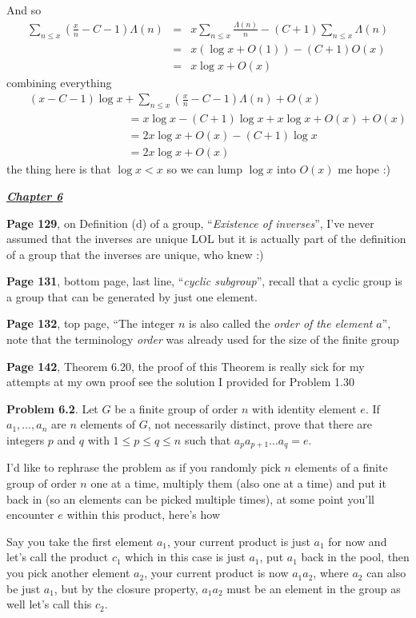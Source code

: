 \documentclass[aps,preprint,preprintnumbers,nofootinbib,showpacs,prd]{revtex4-1}
\newcommand{\nbea}{\begin{eqnarray*}}
\newcommand{\neea}{\end{eqnarray*}}
\begin{document}
And so
%
\nbea
\sum_{n\le x}\left(\frac{x}{n}-C-1\right)\Lambda(n) & = & x\sum_{n\le x}\frac{\Lambda(n)}{n} - (C+1)\sum_{n\le x}\Lambda(n) \\
& = & x(\log x + O(1)) - (C+1)O(x) \\
& = & x\log x + O(x)
\neea
%
combining everything
%
\nbea
&& (x-C-1)\log x+\sum_{n\le x}\left(\frac{x}{n}-C-1\right)\Lambda(n) + O(x) \\
&& ~~~~~~~~~~~~~~~~~~~~~~~~~~~~~~~~~~~~~~~~ = x\log x - (C+1)\log x + x\log x + O(x) + O(x) \\
&& ~~~~~~~~~~~~~~~~~~~~~~~~~~~~~~~~~~~~~~~~ = 2x\log x+O(x) - (C+1) \log x \\
&& ~~~~~~~~~~~~~~~~~~~~~~~~~~~~~~~~~~~~~~~~ = 2x\log x+O(x)
\neea
%
the thing here is that $\log x < x$ so we can lump $\log x$ into $O(x)$ me hope :)

\bigskip
\underline{\textbf{\textit{Chapter 6}}}
\bigskip

{\bf Page 129}, on Definition (d) of a group, ``{\it Existence of inverses}'', I've never assumed that the inverses are unique LOL but it is actually part of the definition of a group that the inverses are unique, who knew :)

{\bf Page 131}, bottom page, last line, ``{\it cyclic subgroup}'', recall that a cyclic group is a group that can be generated by just one element.

{\bf Page 132}, top page, ``The integer $n$ is also called the {\it order of the element} $a$'', note that the terminology {\it order} was already used for the size of the finite group

{\bf Page 142}, Theorem 6.20, the proof of this Theorem is really sick for my attempts at my own proof see the solution I provided for Problem 1.30

{\bf Problem 6.2}. Let $G$ be a finite group of order $n$ with identity element $e$. If $a_1,\ldots,a_n$ are $n$ elements of $G$, not necessarily distinct, prove that there are integers $p$ and $q$ with $1\le p \le q \le n$ such that $a_p a_{p+1} \ldots a_q = e$.

I'd like to rephrase the problem as if you randomly pick $n$ elements of a finite group of order $n$ one at a time, multiply them (also one at a time) and put it back in (so an elements can be picked multiple times), at some point you'll encounter $e$ within this product, here's how

Say you take the first element $a_1$, your current product is just $a_1$ for now and let's call the product $c_1$ which in this case is just $a_1$, put $a_1$ back in the pool, then you pick another element $a_2$, your current product is now $a_1 a_2$, where $a_2$ can also be just $a_1$, but by the closure property, $a_1a_2$ must be an element in the group as well let's call this $c_2$.
\end{document}

